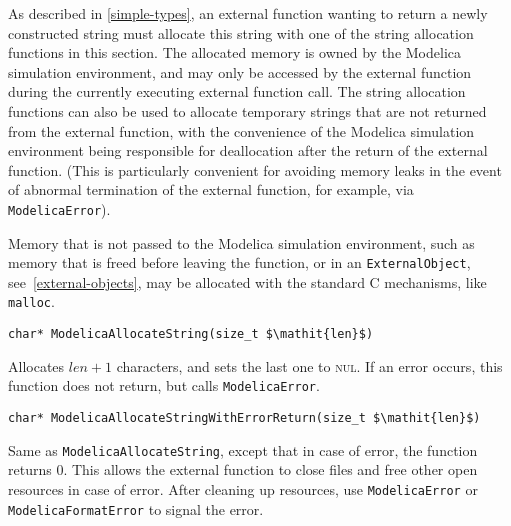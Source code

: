 As described in \cref{simple-types}, an external function wanting to return a newly constructed string must allocate this string with one of the string allocation functions in this section.
The allocated memory is owned by the Modelica simulation environment, and may only be accessed by the external function during the currently executing external function call.
The string allocation functions can also be used to allocate temporary strings that are not returned from the external function, with the convenience of the Modelica simulation environment being responsible for deallocation after the return of the external function.
(This is particularly convenient for avoiding memory leaks in the event of abnormal termination of the external function, for example, via {\lstinline[language=C]!ModelicaError!}).

\begin{nonnormative}
Memory that is not passed to the Modelica simulation environment, such as memory that is freed before leaving the function, or in an {\lstinline!ExternalObject!}, see~\cref{external-objects}, may be allocated with the standard C mechanisms, like {\lstinline[language=C]!malloc!}.
\end{nonnormative}

\begin{functiondefinition}[ModelicaAllocateString]
\begin{synopsis}[C]\begin{lstlisting}
char* ModelicaAllocateString(size_t $\mathit{len}$)
\end{lstlisting}\end{synopsis}
\begin{semantics}
Allocates $\mathit{len}+1$ characters, and sets the last one to \textsc{nul}.
If an error occurs, this function does not return, but calls {\lstinline[language=C]!ModelicaError!}.
\end{semantics}
\end{functiondefinition}

\begin{functiondefinition}[ModelicaAllocateStringWithErrorReturn]
\begin{synopsis}[C]\begin{lstlisting}
char* ModelicaAllocateStringWithErrorReturn(size_t $\mathit{len}$)
\end{lstlisting}\end{synopsis}
\begin{semantics}
Same as {\lstinline[language=C]!ModelicaAllocateString!}, except that in case of error, the function returns 0.
This allows the external function to close files and free other open resources in case of error.
After cleaning up resources, use {\lstinline[language=C]!ModelicaError!} or {\lstinline[language=C]!ModelicaFormatError!} to signal the error.
\end{semantics}
\end{functiondefinition}

